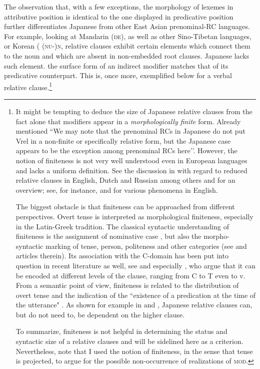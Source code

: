 \documentclass [output=book,colorlinks,citecolor=brown]{langscibook}
\begin{document}
The observation that, with a few exceptions, the morphology of lexemes in attributive position is identical to the one displayed in predicative position further differentiates Japanese from other East Asian prenominal-RC languages. For example, looking at Mandarin (\textsc{de}), as well as other Sino-Tibetan languages, or Korean ( \textsc{(nu-)n}, relative clauses exhibit certain elements which connect them to the noun and which are absent in non-embedded root clauses. Japanese lacks such element. the surface form of an indirect modifier matches that of its predicative counterpart. This is, once more, exemplified below for a verbal relative clause.\footnote{It might be tempting to deduce the size of Japanese relative clauses from the fact alone that modifiers appear in a \textit{morphologically} \textit{finite} form. Already \citet[156]{keenan:1985:relcl} mentioned ``We may note that the prenominal RCs in Japanese do not put Vrel in a non-finite or specifically relative form, but the Japanese case appears to be the exception among prenominal RCs here’’. However, the notion of finiteness is not very well understood even in European languages and lacks a uniform definition. See the discussion in \citet{hudson:1973:tense, stanton:2011:rrc, belikova:2008:syntactically, belk:2017:attributes} with regard to reduced relative clauses in English, Dutch and Russian among others and \citet{nikolaeva:2007:intro} for an overview; see, for instance, \citet{wurmbrand:2005:infinitives, wurmbrand:2014:tense} and \citet{landau:2004:scale, landau:2013:control} for various phenomena in English.

The biggest obstacle is that finiteness can be approached from different perspectives. Overt tense is interpreted as morphological finiteness, especially in the Latin-Greek tradition. The classical syntactic understanding of finiteness is the assignment of nominative case \citep{chomsky:1981:lectures}, but also the morpho-syntactic marking of tense, person, politeness and other categories (see \citealt{nikolaeva:2007:intro} and articles therein). Its association with the C-domain has been put into question in recent literature as well, see \citet{adger:2007:finiteness, bisang:2007:finiteness} and especially \citet{wurmbrand:2020:finiteness}, who argue that it can be encoded at different levels of the clause, ranging from C to T even to v. From a semantic point of view, finiteness is related to the distribution of overt tense and the indication of the ``existence of a predication at the time of the utterance" \citep[201]{platzack:1995:loss}. As shown for example in \citet{ogihara:1994:adverbs} and \citet{miyagawa:2012:case}, Japanese relative clauses can, but do not need to, be dependent on the higher clause.

To summarize, finiteness is not helpful in determining the status and syntactic size of a relative clauses and will be sidelined here as a criterion. Nevertheless, note that I used the notion of finiteness, in the sense that tense is projected, to argue for the possible non-occurrence of realizations of \textsc{mod}.} %
\end{document}
